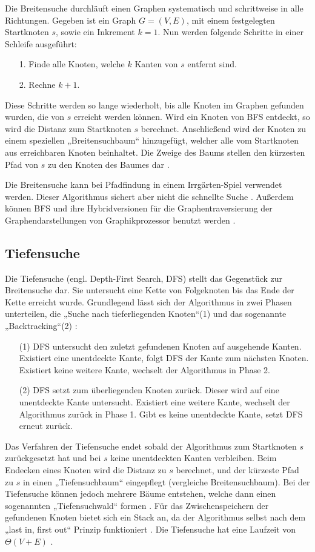 Die Breitensuche durchläuft einen Graphen systematisch und schrittweise in alle Richtungen. Gegeben ist ein Graph $G = (V, E)$, mit einem festgelegten Startknoten $s$, sowie ein Inkrement $k=1$. Nun werden folgende Schritte in einer Schleife ausgeführt:
\begin{itemize}
\item[1.] Finde alle Knoten, welche $k$ Kanten von $s$ entfernt sind.
\item[2.] Rechne $k + 1$.
\end{itemize}
Diese Schritte werden so lange wiederholt, bis alle Knoten im Graphen gefunden wurden, die von $s$ erreicht werden können. Wird ein Knoten von BFS entdeckt, so wird die Distanz zum Startknoten $s$ berechnet. Anschließend wird der Knoten zu einem speziellen „Breitensuchbaum“ hinzugefügt, welcher alle vom Startknoten aus erreichbaren Knoten beinhaltet. Die Zweige des Baums stellen den kürzesten Pfad von $s$ zu den Knoten des Baumes dar \cite[S.594]{Cormen.2009}.

Die Breitensuche kann bei Pfadfindung in einem Irrgärten-Spiel verwendet werden. Dieser Algorithmus sichert aber nicht die schnellte Suche \cite{PBAS18}. Außerdem können BFS und ihre Hybridversionen \cite{HT13} für die Graphentraversierung der Graphendarstellungen von Graphikprozessor benutzt werden \cite{MGG12}.

\subsection{Tiefensuche}

Die Tiefensuche (engl. Depth-First Search, DFS) stellt das Gegenstück zur Breitensuche dar. Sie untersucht eine Kette von Folgeknoten bis das Ende der Kette erreicht wurde. Grundlegend lässt sich der Algorithmus in zwei Phasen unterteilen, die „Suche nach tieferliegenden Knoten“(1) und das sogenannte „Backtracking“(2) \cite{Tarjan.1972}:
\begin{itemize}
	\item[(1)] DFS untersucht den zuletzt gefundenen Knoten auf ausgehende Kanten. Existiert eine unentdeckte Kante, folgt DFS der Kante zum nächsten Knoten. Existiert keine weitere Kante, wechselt der Algorithmus in Phase 2.
	\item[(2)] DFS setzt zum überliegenden Knoten zurück. Dieser wird auf eine unentdeckte Kante untersucht. Existiert eine weitere Kante, wechselt der Algorithmus zurück in Phase 1. Gibt es keine unentdeckte Kante, setzt DFS erneut zurück.
\end{itemize}
Das Verfahren der Tiefensuche endet sobald der Algorithmus zum Startknoten $s$ zurückgesetzt hat und bei $s$ keine unentdeckten Kanten verbleiben. Beim Endecken eines Knoten wird die Distanz zu $s$ berechnet, und der kürzeste Pfad zu $s$ in einen „Tiefensuchbaum“ eingepflegt (vergleiche Breitensuchbaum). Bei der Tiefensuche können jedoch mehrere Bäume entstehen, welche dann einen sogenannten „Tiefensuchwald“ formen \cite[S.603]{Cormen.2009}.
Für das Zwischenspeichern der gefundenen Knoten bietet sich ein Stack an, da der Algorithmus selbst nach dem „last in, first out“ Prinzip funktioniert \cite{Tarjan.1972}. Die Tiefensuche hat eine Laufzeit von $\Theta(V + E)$ \cite[S.606]{Cormen.2009}.

